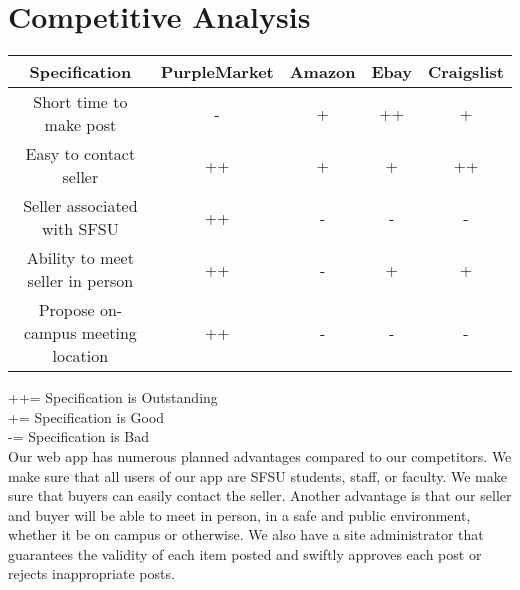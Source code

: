 \section{Competitive Analysis}

\begin{spacing}{1.25}
\begin{center}
\begin{tabular}{ | c | c | c | c | c | }
\hline
Specification 						& PurpleMarket 			& Amazon 				& Ebay 					& Craigslist\\\hline
Short time to make post 			& \cellcolor{red}-		& \cellcolor{yellow}+	& \cellcolor{green}++	& \cellcolor{yellow}+\\\hline
Easy to contact seller	 			& \cellcolor{green}++	& \cellcolor{yellow}+	& \cellcolor{yellow}+	& \cellcolor{green}++\\\hline
Seller associated with SFSU			& \cellcolor{green}++	& \cellcolor{red}-		& \cellcolor{red}-		& \cellcolor{red}-\\\hline
Ability to meet seller in person	& \cellcolor{green}++	& \cellcolor{red}-		& \cellcolor{yellow}+	& \cellcolor{yellow}+\\\hline
Propose on-campus meeting location 	& \cellcolor{green}++	& \cellcolor{red}-		& \cellcolor{red}-		& \cellcolor{red}-\\\hline
\end{tabular}
\end{center}
\tabto{18mm}++\tabto{25mm}= Specification is Outstanding\\
\tabto{18mm}+\tabto{25mm}= Specification is Good\\
\tabto{18mm}-\tabto{25mm}= Specification is Bad\\

Our web app has numerous planned advantages compared to our competitors. We make sure that all users of our app are SFSU students, staff, or faculty. We make sure that buyers can easily contact the seller. Another advantage is that our seller and buyer will be able to meet in person, in a safe and public environment, whether it be on campus or otherwise. We also have a site administrator that guarantees the validity of each item posted and swiftly approves each post or rejects inappropriate posts.
\end{spacing}